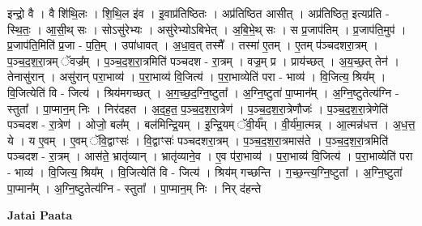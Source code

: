 \documentclass[17pt]{extarticle}
\begin{document}
इन्द्रो॒ वै । वै शि॑थि॒लः । शि॒थि॒ल इ॑व । इ॒वाप्र॑तिष्ठितः । अप्र॑तिष्ठित आसीत् । अप्र॑तिष्ठित॒ इत्यप्र॑ति - स्थि॒तः॒ । आ॒सी॒थ् सः । सोऽसु॑रेभ्यः । असु॑रेभ्योऽबिभेत् । अ॒बि॒भे॒थ् सः । स प्र॒जाप॑तिम् । प्र॒जाप॑ति॒मुप॑ । प्र॒जाप॑ति॒मिति॑ प्र॒जा - प॒ति॒म् । उपा॑धावत् । अ॒धा॒व॒त् तस्मै᳚ । तस्मा॑ ए॒तम् । ए॒तम् प॑ञ्चदशरा॒त्रम् । प॒ञ्च॒द॒श॒रा॒त्रम् ॅवज्र᳚म् । प॒ञ्च॒द॒श॒रा॒त्रमिति॑ पञ्चदश - रा॒त्रम् । वज्र॒म् प्र । प्राय॑च्छत् । अ॒य॒च्छ॒त् तेन॑ । तेनासु॑रान् । असु॑रान् परा॒भाव्य॑ । प॒रा॒भाव्य॑ वि॒जित्य॑ । प॒रा॒भाव्येति॑ परा - भाव्य॑ । वि॒जित्य॒ श्रिय᳚म् । वि॒जित्येति॑ वि - जित्य॑ । श्रिय॑मगच्छत् । अ॒ग॒च्छ॒द॒ग्नि॒ष्टुता᳚ । अ॒ग्नि॒ष्टुता॑ पा॒प्मान᳚म् । अ॒ग्नि॒ष्टुतेत्य॑ग्नि - स्तुता᳚ । पा॒प्मान॒म् निः । निर॑दहत । अ॒द॒ह॒त॒ प॒ञ्च॒द॒श॒रा॒त्रेण॑ । प॒ञ्च॒द॒श॒रा॒त्रेणौजः॑ । प॒ञ्च॒द॒श॒रा॒त्रेणेति॑ पञ्चदश - रा॒त्रेण॑ । ओजो॒ बल᳚म् । बल॑मिन्द्रि॒यम् । इ॒न्द्रि॒यम् ॅवी॒र्य᳚म् । वी॒र्य॑मा॒त्मन्न् । आ॒त्मन्न॑धत्त । अ॒ध॒त्त॒ ये । य ए॒वम् । ए॒वम् ॅवि॒द्वाꣳसः॑ । वि॒द्वाꣳसः॑ पञ्चदशरा॒त्रम् । प॒ञ्च॒द॒श॒रा॒त्रमास॑ते । प॒ञ्च॒द॒श॒रा॒त्रमिति॑ पञ्चदश - रा॒त्रम् । आस॑ते॒ भ्रातृ॑व्यान् । भ्रातृ॑व्याने॒व । ए॒व प॑रा॒भाव्य॑ । प॒रा॒भाव्य॑ वि॒जित्य॑ । प॒रा॒भाव्येति॑ परा - भाव्य॑ । वि॒जित्य॒ श्रिय᳚म् । वि॒जित्येति॑ वि - जित्य॑ । श्रिय॑म् गच्छन्ति । ग॒च्छ॒न्त्य॒ग्नि॒ष्टुता᳚ । अ॒ग्नि॒ष्टुता॑ पा॒प्मान᳚म् । अ॒ग्नि॒ष्टुतेत्य॑ग्नि - स्तुता᳚ । पा॒प्मान॒म् निः । निर् द॑हन्ते \newline

\textbf{Jatai Paata} \newline
\end{document}
